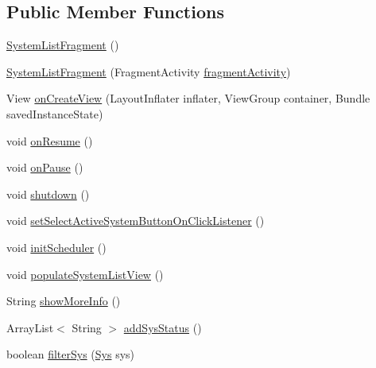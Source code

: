 \subsection*{Public Member Functions}
\begin{DoxyCompactItemize}
\item 
\hyperlink{classpt_1_1lsts_1_1asa_1_1fragments_1_1SystemListFragment_aac655155a02371e37bf721f60f1e5788}{System\+List\+Fragment} ()
\item 
\hyperlink{classpt_1_1lsts_1_1asa_1_1fragments_1_1SystemListFragment_aae1a75eb621a73d7d671a2e178d955ab}{System\+List\+Fragment} (Fragment\+Activity \hyperlink{classpt_1_1lsts_1_1asa_1_1fragments_1_1SystemListFragment_aac7b772fe4d6f717eac3d51d0ea59a63}{fragment\+Activity})
\item 
View \hyperlink{classpt_1_1lsts_1_1asa_1_1fragments_1_1SystemListFragment_ad21d52ae3e093d19e5ecc936e70d78e9}{on\+Create\+View} (Layout\+Inflater inflater, View\+Group container, Bundle saved\+Instance\+State)
\item 
void \hyperlink{classpt_1_1lsts_1_1asa_1_1fragments_1_1SystemListFragment_a7b88a996a0786c2b30a32be85bdb6349}{on\+Resume} ()
\item 
void \hyperlink{classpt_1_1lsts_1_1asa_1_1fragments_1_1SystemListFragment_a71068b9ee1d2d64aa1ef8b2ab2aa5399}{on\+Pause} ()
\item 
void \hyperlink{classpt_1_1lsts_1_1asa_1_1fragments_1_1SystemListFragment_aae4e3feff2d73082186b4af778ca6514}{shutdown} ()
\item 
void \hyperlink{classpt_1_1lsts_1_1asa_1_1fragments_1_1SystemListFragment_a812ffe3a2083710623ec9cf6afb97b96}{set\+Select\+Active\+System\+Button\+On\+Click\+Listener} ()
\item 
void \hyperlink{classpt_1_1lsts_1_1asa_1_1fragments_1_1SystemListFragment_a2964574ca2b74394575cb78b4dacac4d}{init\+Scheduler} ()
\item 
void \hyperlink{classpt_1_1lsts_1_1asa_1_1fragments_1_1SystemListFragment_acae872fafb4dd562d69bb96c497b205e}{populate\+System\+List\+View} ()
\item 
String \hyperlink{classpt_1_1lsts_1_1asa_1_1fragments_1_1SystemListFragment_a86f52843362b5d387452cbf2b008b819}{show\+More\+Info} ()
\item 
Array\+List$<$ String $>$ \hyperlink{classpt_1_1lsts_1_1asa_1_1fragments_1_1SystemListFragment_aaaae202bd677ce17ebc5efc1b6fba846}{add\+Sys\+Status} ()
\item 
boolean \hyperlink{classpt_1_1lsts_1_1asa_1_1fragments_1_1SystemListFragment_ae8f2642bdc85b739dfe76f0f6f4b6282}{filter\+Sys} (\hyperlink{classpt_1_1lsts_1_1asa_1_1sys_1_1Sys}{Sys} sys)

\end{DoxyCompactItemize}
